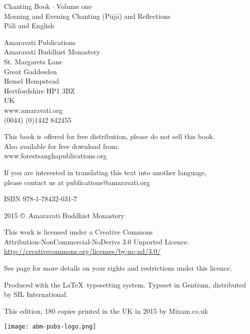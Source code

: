 
\thispagestyle{empty}

{\centering\small
\setlength{\parskip}{15pt}

Chanting Book $\cdot$ Volume one\\
Morning and Evening Chanting (Pūjā) and Reflections\\
Pāli and English

Amaravati Publications\\
Amaravati Buddhist Monastery\\
St. Margarets Lane\\
Great Gaddesden\\
Hemel Hempstead\\
Hertfordshire HP1 3BZ\\
UK\\
www.amaravati.org\\
(0044) (0)1442 842455

This book is offered for free distribution, please do not sell this book.\\
Also available for free download from:\\
www.forestsanghapublications.org

If you are interested in translating this text into another language,\\
please contact us at publications@amaravati.org

ISBN 978-1-78432-031-7

2015 \copyright\ Amaravati Buddhist Monastery

\vfill

This work is licensed under a Creative Commons\\
Attribution-NonCommercial-NoDerivs 3.0 Unported Licence.\\
\href{http://creativecommons.org/licenses/by-nc-nd/3.0/}{http://creativecommons.org/licenses/by-nc-nd/3.0/}

See page \pageref{copyright-details} for more details on your rights and restrictions under this licence.


Produced with the \LaTeX\ typesetting system. Typeset in Gentium, distributed by SIL International.

This edition, 180 copies printed in the UK in 2015 by Mixam.co.uk

\texttt{[image: abm-pubs-logo.png]}

}

